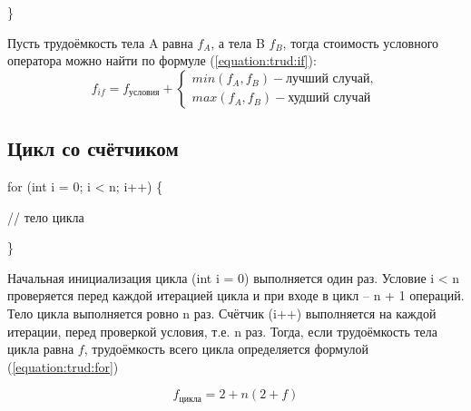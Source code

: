             \}

            Пусть трудоёмкость тела A равна $ f_A $, а тела B $ f_B $, тогда
            стоимость условного оператора можно найти по формуле (\ref{equation:trud:if}):
            \begin{equation}
                f_{if} = f_\text{условия} + \left\{
                    \begin{matrix}
                    min(f_A, f_B) - \text{лучший случай},\\
                    max(f_A, f_B) - \text{худший случай} 
                    \end{matrix}\right.
                \label{equation:trud:if}
            \end{equation}

        \subsection{Цикл со счётчиком}
            for (int i = 0; i < n; i++) \{

                // тело цикла

            \}
            
            Начальная инициализация цикла (int i = 0) выполняется один раз.
            Условие i < n проверяется перед каждой итерацией цикла и при входе в цикл -- n + 1 операций.
            Тело цикла выполняется ровно n раз.
            Счётчик (i++) выполняется на каждой итерации, перед проверкой условия, т.е. n раз.
            Тогда, если трудоёмкость тела цикла равна $ f $, трудоёмкость всего цикла определяется формулой (\ref{equation:trud:for})

            \begin{equation}
                f_\text{цикла} = 2 + n(2 + f)
                \label{equation:trud:for}
            \end{equation}

\newpage
